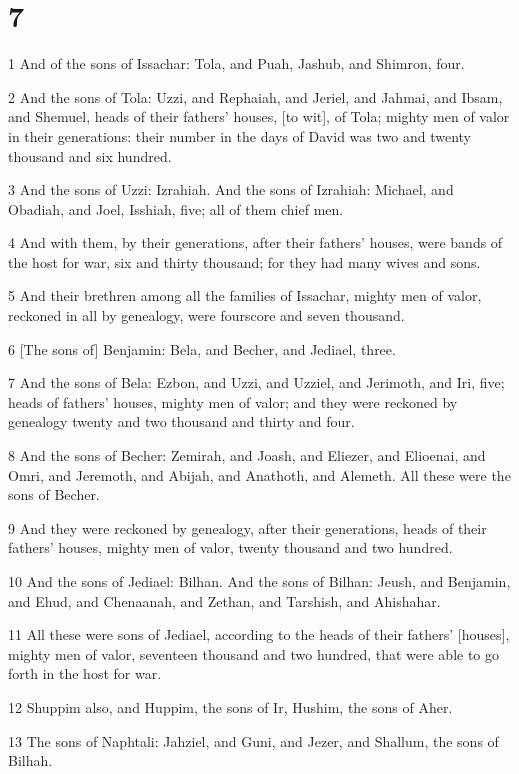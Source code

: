 \chapter{7}

\par 1 And of the sons of Issachar: Tola, and Puah, Jashub, and Shimron, four.
\par 2 And the sons of Tola: Uzzi, and Rephaiah, and Jeriel, and Jahmai, and Ibsam, and Shemuel, heads of their fathers' houses, [to wit], of Tola; mighty men of valor in their generations: their number in the days of David was two and twenty thousand and six hundred.
\par 3 And the sons of Uzzi: Izrahiah. And the sons of Izrahiah: Michael, and Obadiah, and Joel, Isshiah, five; all of them chief men.
\par 4 And with them, by their generations, after their fathers' houses, were bands of the host for war, six and thirty thousand; for they had many wives and sons.
\par 5 And their brethren among all the families of Issachar, mighty men of valor, reckoned in all by genealogy, were fourscore and seven thousand.
\par 6 [The sons of] Benjamin: Bela, and Becher, and Jediael, three.
\par 7 And the sons of Bela: Ezbon, and Uzzi, and Uzziel, and Jerimoth, and Iri, five; heads of fathers' houses, mighty men of valor; and they were reckoned by genealogy twenty and two thousand and thirty and four.
\par 8 And the sons of Becher: Zemirah, and Joash, and Eliezer, and Elioenai, and Omri, and Jeremoth, and Abijah, and Anathoth, and Alemeth. All these were the sons of Becher.
\par 9 And they were reckoned by genealogy, after their generations, heads of their fathers' houses, mighty men of valor, twenty thousand and two hundred.
\par 10 And the sons of Jediael: Bilhan. And the sons of Bilhan: Jeush, and Benjamin, and Ehud, and Chenaanah, and Zethan, and Tarshish, and Ahishahar.
\par 11 All these were sons of Jediael, according to the heads of their fathers' [houses], mighty men of valor, seventeen thousand and two hundred, that were able to go forth in the host for war.
\par 12 Shuppim also, and Huppim, the sons of Ir, Hushim, the sons of Aher.
\par 13 The sons of Naphtali: Jahziel, and Guni, and Jezer, and Shallum, the sons of Bilhah.

